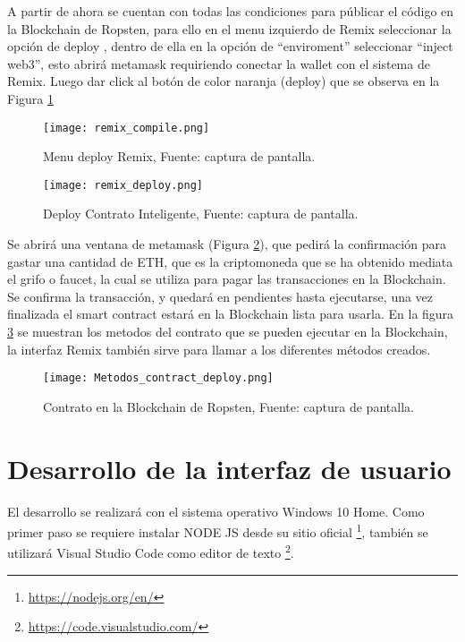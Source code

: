 A partir de ahora se cuentan con todas las condiciones para públicar el código en la  Blockchain de Ropsten,
para ello en el menu izquierdo de Remix  seleccionar la opción de  deploy , dentro de ella en la opción de “enviroment”  seleccionar  “inject web3”, 
esto abrirá metamask requiriendo conectar la wallet con el sistema de Remix. Luego dar click al botón de color naranja (deploy) que se observa en la Figura \ref{img:remix_compile}

\begin{figure}[H]
  \centering
  {\texttt{[image: remix\_compile.png]}}
  \caption{Menu deploy Remix, Fuente: captura de pantalla. }
  \label{img:remix_compile}
\end{figure}

\begin{figure}[H]
  \centering
  {\texttt{[image: remix\_deploy.png]}}
  \caption{Deploy Contrato Inteligente, Fuente: captura de pantalla. }
  \label{img:remix_deploy}
\end{figure}

Se abrirá una ventana de metamask (Figura \ref{img:remix_deploy}), que pedirá la confirmación para gastar una cantidad de ETH, que es la criptomoneda
que se ha obtenido mediata el grifo o faucet, la cual se utiliza para pagar las transacciones en la Blockchain.
Se confirma la transacción, y quedará en pendientes hasta ejecutarse, una vez finalizada el smart contract estará en la  Blockchain lista para
usarla.
En la figura \ref{img:metodos_contract_deploy} se muestran los metodos del contrato que se pueden ejecutar en la Blockchain, la interfaz
Remix también sirve para llamar a los diferentes métodos creados.
\begin{figure}[hbt!]
  \centering
  {\texttt{[image: Metodos\_contract\_deploy.png]}}
  \caption{Contrato en la  Blockchain de Ropsten, Fuente: captura de pantalla. }
  \label{img:metodos_contract_deploy}
\end{figure}


\section{Desarrollo de la interfaz de usuario}
El desarrollo se realizará con el sistema operativo Windows 10 Home.
Como primer paso se requiere instalar NODE JS desde su sitio oficial \footnote{\url{https://nodejs.org/en/}},
también se utilizará Visual Studio Code como editor de texto \footnote{\url{https://code.visualstudio.com/}}.

